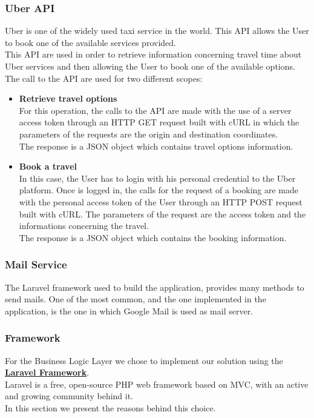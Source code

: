 \subsubsection*{Uber API}
Uber is one of the widely used taxi service in the world. This API allows the User to book one of the available services provided.\\
This API are used in order to retrieve information concerning travel time about Uber services and then allowing the User to book one of the available options.\\
The call to the API are used for two different scopes:
\begin{itemize}
	\item \textbf{Retrieve travel options}\\
	For this operation, the calls to the API are made with the use of a server access token through an HTTP GET request built with cURL in which the parameters of the requests are the origin and destination coordinates.\\
	The response is a JSON object which contains travel options information.
	\item \textbf{Book a travel}\\
	In this case, the User has to login with his personal credential to the Uber platform. Once is logged in, the calls for the request of a booking are made with the personal access token of the User through an HTTP POST request built with cURL. The parameters of the request are the access token and the informations concerning the travel.\\
	The response is a JSON object which contains the booking information.
\end{itemize}

\subsubsection*{Mail Service}
The Laravel framework used to build the application, provides many methods to send mails. One of the most common, and the one implemented in the application, is the one in which Google Mail is used as mail server. 

\subsubsection{Framework}
\label{backendchoice}
For the Business Logic Layer we chose to implement our solution using the \href{https://laravel.com/}{\textbf{Laravel Framework}}.\\
Laravel is a free, open-source PHP web framework based on MVC, with an active and growing community behind it.\\
In this section we present the reasons behind this choice.

